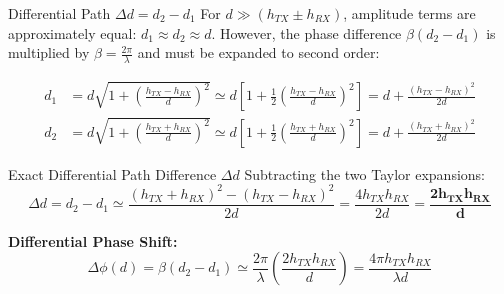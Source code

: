 \documentclass[aspectratio=169, 10pt]{beamer}
\begin{document}
\begin{frame}{Differential Path $\Delta d = d_2 - d_1$}
\small
    For $d \gg (h_{TX} \pm h_{RX})$, amplitude terms are approximately equal: $d_1 \approx d_2 \approx d$. 
    However, the phase difference $\beta(d_2 - d_1)$ is multiplied by $\beta = \frac{2\pi}{\lambda}$ and must be expanded to second order:

    \begin{align}
        d_1 &= d \sqrt{1 + \left(\frac{h_{TX} - h_{RX}}{d}\right)^2} \simeq d \left[ 1 + \frac{1}{2}\left(\frac{h_{TX} - h_{RX}}{d}\right)^2 \right] = d + \frac{(h_{TX} - h_{RX})^2}{2d} \\
        d_2 &= d \sqrt{1 + \left(\frac{h_{TX} + h_{RX}}{d}\right)^2} \simeq d \left[ 1 + \frac{1}{2}\left(\frac{h_{TX} + h_{RX}}{d}\right)^2 \right] = d + \frac{(h_{TX} + h_{RX})^2}{2d}
    \end{align}

    \begin{block}{Exact Differential Path Difference $\Delta d$}
        Subtracting the two Taylor expansions:
        \begin{equation}
            \Delta d = d_2 - d_1 \simeq \frac{(h_{TX} + h_{RX})^2 - (h_{TX} - h_{RX})^2}{2d} = \frac{4 h_{TX} h_{RX}}{2d} = \mathbf{\frac{2 h_{TX} h_{RX}}{d}}
        \end{equation}
    \end{block}

    \textbf{Differential Phase Shift:}
    \begin{equation}
        \Delta\phi(d) = \beta (d_2 - d_1) \simeq \frac{2\pi}{\lambda} \left(\frac{2 h_{TX} h_{RX}}{d}\right) = \frac{4\pi h_{TX} h_{RX}}{\lambda d}
    \end{equation}
\end{frame}
\end{document}
